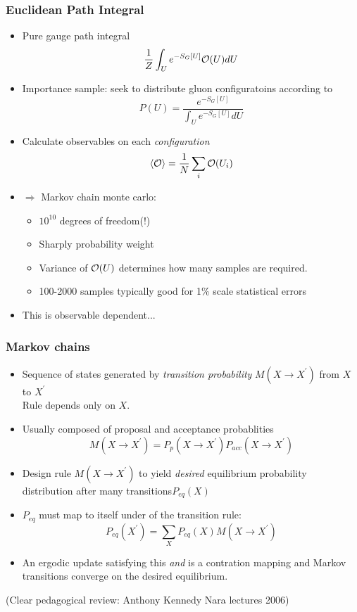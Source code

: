 \documentclass[pdf,ps,8pt]{beamer}
\begin{document}
\begin{frame}[fragile]\small\frametitle{Euclidean Path Integral}
\begin{itemize}
\item Pure gauge path integral
  $$
  \frac{1}{Z} \int_U e^{-S_G[U]} {\cal O}(U) dU 
  $$
\item Importance sample: seek to distribute gluon configuratoins according to
  $$
  P(U) = \frac{e^{-S_G[U]}}{\int_U e^{-S_G[U]} dU}
  $$
\item Calculate observables on each \emph{configuration}
  $$
\langle {\cal O} \rangle = \frac{1}{N} \sum\limits_i {\cal O}(U_i) 
$$
\item $\Rightarrow$ Markov chain monte carlo:
\begin{itemize}
\item $10^{10}$ degrees of freedom(!)
\item Sharply probability weight
\item Variance of ${\cal O}(U)$ determines how many samples are required.
\item 100-2000 samples typically good for 1\% scale statistical errors
\end{itemize}
\item This is observable dependent...  
\end{itemize}
\end{frame}


\begin{frame}[fragile]\small\frametitle{Markov chains}
  \begin{itemize}
\item Sequence of states generated by \emph{transition probability} $M(X\to X^\prime)$ from $X$ to $X^\prime$\\
      Rule depends only on $X$.
\item Usually composed of proposal and acceptance probablities
$$
M(X\to X^\prime) = P_p(X\to X^\prime) P_{acc}(X\to X^\prime)
$$
\item Design rule $M(X\to X^\prime)$ to yield \emph{desired} equilibrium probability distribution after many transitions$P_{eq}(X)$
\item $P_{eq}$ must map to itself under of the transition rule:
$$
P_{eq}(X^\prime) = \sum\limits_X P_{eq}(X) M(X \to X^\prime) 
$$
\item An ergodic update satisfying this \emph{and} is a contration mapping and 
      Markov transitions converge on the desired equilibrium.
  \end{itemize}
(Clear pedagogical review: Anthony Kennedy Nara lectures 2006)
\end{frame}
\end{document}
